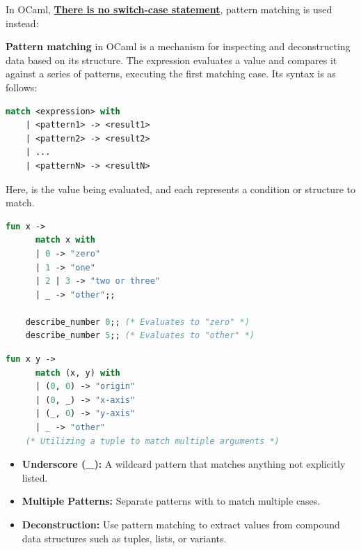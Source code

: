 In OCaml, \underline{\textbf{There is no switch-case statement}}, pattern matching is used instead:

\begin{Def}

    \textbf{Pattern matching} in OCaml is a mechanism for inspecting and deconstructing data based on its structure. 
    The  expression evaluates a value and compares it against a series of patterns, executing the first matching case. Its syntax is as follows:
    
    \begin{lstlisting}[language=OCaml, caption={Pattern Matching Syntax}, numbers=none]
    match <expression> with
    | <pattern1> -> <result1>
    | <pattern2> -> <result2>
    | ...
    | <patternN> -> <resultN>
    \end{lstlisting}
    
    \noindent
    Here,  is the value being evaluated, and each  represents a condition or structure to match.
    
    \begin{lstlisting}[language=OCaml, caption={Matching an Integer}, numbers=none]
    fun x ->
      match x with
      | 0 -> "zero"
      | 1 -> "one"
      | 2 | 3 -> "two or three"
      | _ -> "other";;
    
    describe_number 0;; (* Evaluates to "zero" *)
    describe_number 5;; (* Evaluates to "other" *)
    \end{lstlisting}

    \begin{lstlisting}[language=OCaml, caption={Matching Multiple Arguments}, numbers=none]
    fun x y ->
      match (x, y) with
      | (0, 0) -> "origin"
      | (0, _) -> "x-axis"
      | (_, 0) -> "y-axis"
      | _ -> "other"
    (* Utilizing a tuple to match multiple arguments *)
    \end{lstlisting}
    
    \begin{itemize}
        \item \textbf{Underscore (\_):} A wildcard pattern that matches anything not explicitly listed.
        \item \textbf{Multiple Patterns:} Separate patterns with \snippet{|} to match multiple cases.
        \item \textbf{Deconstruction:} Use pattern matching to extract values from compound data structures such as tuples, lists, or variants.
    \end{itemize}
\end{Def}

